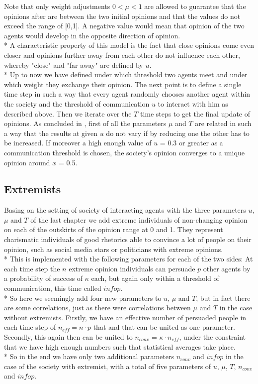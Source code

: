 \documentclass[11pt]{article}
\begin{document}
Note that only weight adjustments $0 < \mu < 1$ are allowed to guarantee that the opinions after are between the two initial opinions and that the values do not exceed the range of [0,1]. A negative value would mean that opinion of the two agents would develop in the opposite direction of opinion. \\*
A characteristic property of this model is the fact that close opinions come even closer and opinions further away from each other do not influence each other, whereby "close" and "far-away" are defined by $u$. \\*
Up to now we have defined under which threshold two agents meet and under which weight they exchange their opinion. The next point is to define a single time step in such a way that every agent randomly chooses another agent within the society and the threshold of communication $u$ to interact with him as described above. Then we iterate over the $T$ time steps to get the final update of opinions.
As concluded in \cite{Minor}, first of all the parameters $\mu$ and $T$ are related in such a way that the results at given $u$ do not vary if by reducing one the other has to be increased. If moreover a high enough value of $u$ = 0.3 or greater as a communication threshold is chosen, the society's opinion converges to a unique opinion around $x$ = 0.5.

\subsection{Extremists}
Basing on the setting of society of interacting agents with the three parameters $u$, $\mu$ and $T$ of the last chapter we add extreme individuals of non-changing opinion on each of the outskirts of the opinion range at 0 and 1. They represent charismatic individuals of good rhetorics able to convince a lot of people on their opinion, such as social media stars or politicians with extreme opinions. \\*
This is implemented with the following parameters for each of the two sides: At each time step the $n$ extreme opinion individuals can persuade $p$ other agents by a probability of success of $\kappa$ each, but again only within a threshold of communication, this time called $infop$. \\*
So here we seemingly add four new parameters to $u$, $\mu$ and $T$, but in fact there are some correlations, just as there were correlations between $\mu$ and $T$ in the case without extremists.
Firstly, we have an effective number of persuaded people in each time step of $n_{eff} = n \cdot p$ that and that can be united as one parameter. Secondly, this again then can be united to $n_{conv}$ = $\kappa \cdot n_{eff}$, under {\color{red}the constraint that we have high enough numbers such that statistical averages take place}. \\*
So in the end we have only two additional parameters $n_{conv}$ and $infop$ in the case of the society with extremist, with a total of five parameters of $u$, $\mu$, $T$, $n_{conv}$ and $infop$.
\end{document}
